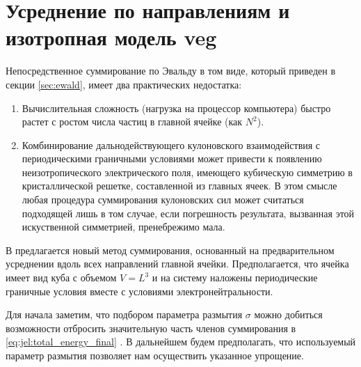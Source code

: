 \section{Усреднение по направлениям и изотропная модель \texorpdfstring{\acrshort{veg}}{ВЭГ}}
Непосредственное суммирование по Эвальду в том виде, который приведен в секции \ref{sec:ewald}, имеет два практических недостатка:
\begin{enumerate}
    \item Вычислительная сложность (нагрузка на процессор компьютера) быстро растет с ростом числа частиц в главной ячейке (как $N^2$).
    \item Комбинирование дальнодействующего кулоновского взаимодействия с периодическими граничными условиями может привести к появлению неизотропического электрического поля, имеющего кубическую симметрию в кристаллической решетке, составленной из главных ячеек.
        В этом смысле любая процедура суммирования кулоновских сил может считаться подходящей лишь в том случае, если погрешность результата, вызванная этой искуственной симметрией, пренебрежимо мала.
\end{enumerate}
В \cite{jel:pre-averaged_summation} предлагается новый метод суммирования, основанный на предварительном усреднении вдоль всех направлений главной ячейки.
Предполагается, что ячейка имеет вид куба с объемом $V = L^3$ и на систему наложены периодические граничные условия вместе с условиями электронейтральности.

Для начала заметим, что подбором параметра размытия $\sigma$ можно добиться возможности отбросить значительную часть членов суммирования в \eqref{eq:jel:total_energy_final} \cite{rapaport:terms_cutoff}.
В дальнейшем будем предполагать, что используемый параметр размытия позволяет нам осуществить указанное упрощение.

